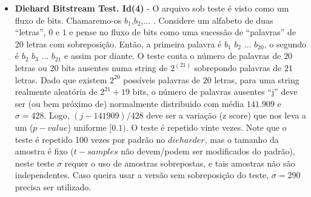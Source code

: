 \begin{itemize}
   \item \textbf{Diehard Bitstream Test. Id(4)} - O arquivo sob teste é visto como um fluxo de bits. Chamaremo-os $b_1$,$b_2$,$\dots$ . Considere um alfabeto de duas ``letras'', $0$ e $1$ e pense no fluxo de bits como uma sucessão de ``palavras'' de $20$ letras com sobreposição. Então, a primeira palavra é $b_1$ $b_2$ $\dots$ $b_{20}$, o segundo é $b_2$ $b_3$ $\dots$ $b_{21}$ e assim por diante. O teste conta o número de palavras de $20$ letras ou $20$ bits ausentes numa string de $2^{(21)}$ sobrepondo palavras de $21$ letras. Dado que existem $2^{20}$ possíveis palavras de $20$ letras, para uma string realmente aleatória de $2^{21}+19$ bits, o número de palavras ausentes ``j'' deve ser (ou bem próximo de) normalmente distribuido com média $141.909$ e $\sigma = 428$. Logo, $(j-141909)/428$ deve ser a variação (z score) que nos leva a um ($p-value$) uniforme $[0.1)$. O teste é repetido vinte vezes. Note que o teste é repetido 100 vezes por padrão no $dieharder$, mas o tamanho da amostra é fixo ($t-samples$ não devem/podem ser modificados do padrão), neste teste $\sigma$ requer o uso de amostras sobrepostas, e tais amostras não são independentes. Caso queira usar a versão sem sobreposição do teste, $\sigma = 290$ precisa ser utilizado.
   

\end{itemize}
